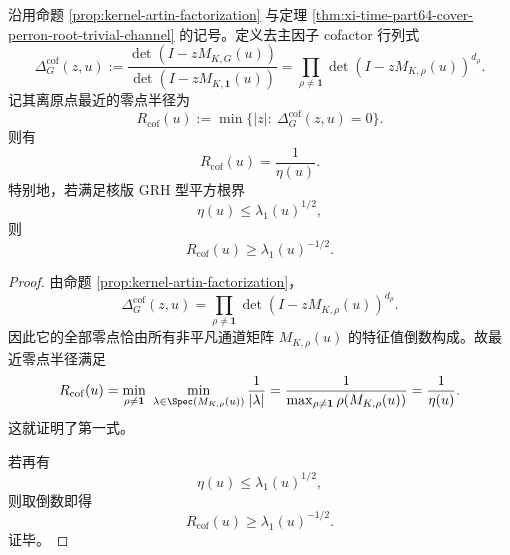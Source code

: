 \begin{theorem}\label{thm:xi-time-part64ab-artin-cofactor-nearest-zero-radius}
沿用命题 \ref{prop:kernel-artin-factorization} 与定理 \ref{thm:xi-time-part64-cover-perron-root-trivial-channel} 的记号。定义去主因子 cofactor 行列式
\[
\Delta_G^{\mathrm{cof}}(z,u)
:=
\frac{\det(I-zM_{K,G}(u))}{\det(I-zM_{K,\mathbf 1}(u))}
=
\prod_{\rho\neq \mathbf 1}\det(I-zM_{K,\rho}(u))^{d_\rho}.
\]
记其离原点最近的零点半径为
\[
R_{\mathrm{cof}}(u)
:=
\min\bigl\{|z|:\ \Delta_G^{\mathrm{cof}}(z,u)=0\bigr\}.
\]
则有
\[
\boxed{\;
R_{\mathrm{cof}}(u)=\frac{1}{\eta(u)}.\;}
\]
特别地，若满足核版 GRH 型平方根界
\[
\eta(u)\le \lambda_1(u)^{1/2},
\]
则
\[
\boxed{\;
R_{\mathrm{cof}}(u)\ge \lambda_1(u)^{-1/2}.\;}
\]
\end{theorem}
\begin{proof}
由命题 \ref{prop:kernel-artin-factorization}，
\[
\Delta_G^{\mathrm{cof}}(z,u)
=
\prod_{\rho\neq \mathbf 1}\det(I-zM_{K,\rho}(u))^{d_\rho}.
\]
因此它的全部零点恰由所有非平凡通道矩阵 \(M_{K,\rho}(u)\) 的特征值倒数构成。故最近零点半径满足
\[
R_{\mathrm{cof}}(u)
=
\min_{\rho\neq \mathbf 1}\ \min_{\lambda\in\Spec(M_{K,\rho}(u))}
\frac{1}{|\lambda|}
=
\frac{1}{\max_{\rho\neq \mathbf 1}\rho(M_{K,\rho}(u))}
=
\frac{1}{\eta(u)}.
\]
这就证明了第一式。

若再有
\[
\eta(u)\le \lambda_1(u)^{1/2},
\]
则取倒数即得
\[
R_{\mathrm{cof}}(u)\ge \lambda_1(u)^{-1/2}.
\]
证毕。
\end{proof}

